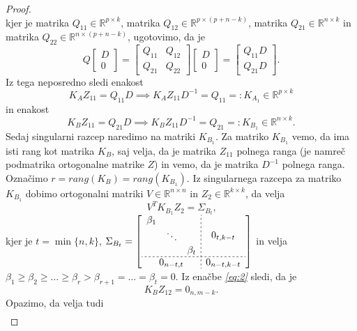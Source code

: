 \documentclass[mat1]{article}
\theoremstyle{definition}
\begin{document}
\begin{proof}
$$$$ kjer je matrika $Q_{11} \in \mathbb{R}^{p \times k}$, matrika $Q_{12} \in \mathbb{R}^{p \times (p+n-k)}$, matrika $Q_{21} \in \mathbb{R}^{ n \times k}$ in matrika $Q_{22} \in \mathbb{R}^{ n \times (p+n-k)}$, ugotovimo, da je
$$Q
\begin{bmatrix}
D \\ 
0
\end{bmatrix} = 
\begin{bmatrix}
Q_{11} & Q_{12} \\ 
Q_{21} & Q_{22}
\end{bmatrix}
\begin{bmatrix}
D \\ 
0
\end{bmatrix} =
\begin{bmatrix}
Q_{11} D \\ 
Q_{21} D
\end{bmatrix} \text{.}
$$
Iz tega neposredno sledi enakost
$$
K_A Z_{11} = Q_{11} D \implies K_A Z_{11} D^{-1} = Q_{11} =: K_{A_1}  \in \mathbb{R}^{p \times k} %
$$
in enakost
$$
K_B Z_{11} = Q_{21} D \implies K_B Z_{11} D^{-1} = Q_{21} =: K_{B_1} \in \mathbb{R}^{ n \times k} \text{.}
$$
Sedaj singularni razcep naredimo na matriki $K_{B_1}$. Za matriko $K_{B_1}$ vemo, da ima isti rang kot matrika $K_B$, saj velja, da je matrika $Z_{11}$ polnega ranga (je namreč podmatrika ortogonalne matrike $Z$) in vemo, da je matrika $D^{-1}$ polnega ranga. Označimo $r = rang(K_B) = rang(K_{B_1})$. Iz singularnega razcepa za matriko $K_{B_1}$ dobimo ortogonalni matriki $V \in \mathbb{R}^{ n \times n}$ in $Z_2 \in \mathbb{R}^{ k \times k}$, da velja
\begin{equation}
V^T K_{B_1} Z_2 = \Sigma_{B_t}
 \text{,}  \label{eq:3}
\end{equation}
kjer je $t = \min\{n, k\}$, 
$\Sigma_{B_t} = 
\left[
\begin{array}{c;{2pt/2pt}c}
\begin{matrix}
\beta_1 & & \\
 & \ddots & \\
 & & \beta_t
\end{matrix} & 0_{t, k - t}
 \\ \hdashline[2pt/2pt]
0_{n-t, t} & 0_{n-t, k-t}
\end{array} \right]$
in velja 
$ \beta_1 \geq \beta_2 \geq \ldots \geq \beta_r > \beta_{r+1} = \ldots = \beta_t = 0 \text{.}$ 
\newline
Iz enačbe \textit{\eqref{eq:2}} sledi, da je
$$
K_B Z_{12} = 0_{n, m-k} \text{.}
$$
Opazimo, da velja tudi
\begin{gather*}

\end{gather*}
\end{proof}
\end{document}

